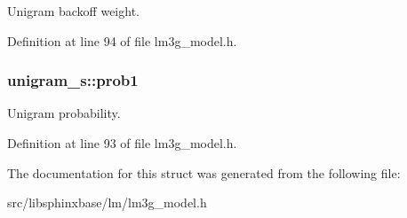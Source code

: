 Unigram backoff weight. 



Definition at line 94 of file lm3g\_\-model.h.
\subsubsection[{prob1}]{ {\bf unigram\_\-s::prob1}}\label{structunigram__s_488db9623272838a933cd4b768409fea}


Unigram probability. 



Definition at line 93 of file lm3g\_\-model.h.

The documentation for this struct was generated from the following file:\begin{CompactItemize}
\item 
src/libsphinxbase/lm/lm3g\_\-model.h\end{CompactItemize}
